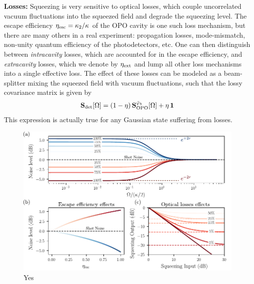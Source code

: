 \noindent \textbf{Losses: } Squeezing is very sensitive to optical losses, which couple uncorrelated vacuum fluctuations into the squeezed field and degrade the squeezing level. The escape efficiency $\eta_{\rm esc}=\kappa_2/\kappa$ of the OPO cavity is one such loss mechanism, but there are many others in a real experiment: propagation losses, mode-mismatch, non-unity quantum efficiency of the photodetectors, etc. One can then distinguish between \textit{intracavity} losses, which are accounted for in the escape efficiency, and \textit{extracavity} losses, which we denote by $\eta_{\rm ext}$ and lump all other loss mechanisms into a single effective loss. The effect of these losses can be modeled as a beam-splitter mixing the squeezed field with vacuum fluctuations, such that the lossy covariance matrix is given by
\begin{equation}\mathbf{S}_{\rm det}[\Omega] = (1-\eta) \, \mathbf{S}^{\bar \varphi_b}_{\mathrm{OPO}}[\Omega] + \eta \, \mathbf{1}
  \label{II.xx3}
\end{equation}
This expression is actually true for any Gaussian state suffering from losses. \\ 
\begin{figure}[h!]
\centering
\includegraphics[width=\textwidth]{./chap2/fig/OPONoises.pdf}
\caption{Yes} 
\end{figure}


